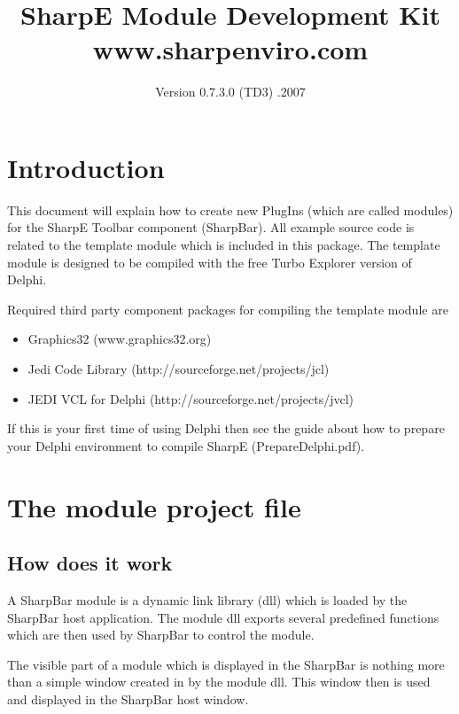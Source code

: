 \documentclass[a4paper]{article}
\begin{document}
\title{ {\bf SharpE} \break \break
{\bf Module Development Kit }\break 
\normalsize www.sharpenviro.com}
\date{Version 0.7.3.0 (TD3) \break {}.2007}
\maketitle
\thispagestyle{empty}
\tableofcontents
\thispagestyle{empty}
\newpage
\setcounter{page}{1}


\section{Introduction}
  This document will explain how to create new PlugIns (which are called modules) for the SharpE Toolbar component (SharpBar). All example source code is related to the template module which is included in this package. The template module is designed to be compiled with the free Turbo Explorer version of Delphi.

  \medskip
  Required third party component packages for compiling the template module are
      \begin{itemize}
        \item Graphics32 (www.graphics32.org)
        \item Jedi Code Library (http://sourceforge.net/projects/jcl)
        \item JEDI VCL for Delphi (http://sourceforge.net/projects/jvcl) 
      \end{itemize}
  \medskip
  If this is your first time of using Delphi then see the guide about how to prepare your Delphi environment to compile SharpE (PrepareDelphi.pdf).

\section{The module project file}
\subsection{How does it work}
  A SharpBar module is a dynamic link library (dll) which is loaded by the SharpBar host application. The module dll exports several predefined functions which are then used by SharpBar to control the module. 

  The visible part of a module which is displayed in the SharpBar is nothing more than a simple window created in by the module dll. This window then is used and displayed in the SharpBar host window. 
\end{document}
